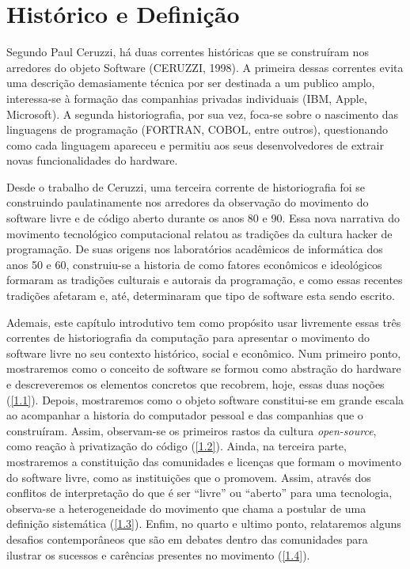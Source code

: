 \chapter{Hist\'orico e Definiç\~ao} \label{1}

Segundo Paul Ceruzzi, há duas correntes históricas que se construíram nos arredores do objeto Software (CERUZZI, 1998). A primeira dessas correntes evita uma descrição demasiamente técnica por ser destinada a um publico amplo, interessa-se à formação das companhias privadas individuais (IBM, Apple, Microsoft). A segunda historiografia, por sua vez, foca-se sobre o nascimento das linguagens de programação (FORTRAN, COBOL, entre outros), questionando como cada linguagem apareceu e permitiu aos seus desenvolvedores de extrair novas funcionalidades do hardware.

Desde o trabalho de Ceruzzi, uma terceira corrente de historiografia foi se construindo paulatinamente nos arredores da observação do movimento do software livre e de código aberto durante os anos 80 e 90. Essa nova narrativa do movimento tecnológico computacional relatou as tradições da cultura hacker de programação. De suas origens nos laboratórios acadêmicos de informática dos anos 50 e 60, construiu-se a historia de como fatores econômicos e ideológicos formaram as tradições culturais e autorais da programação, e como essas recentes tradições afetaram e, até, determinaram que tipo de software esta sendo escrito.

Ademais, este capítulo introdutivo tem como propósito usar livremente essas três correntes de historiografia da computação para apresentar o movimento do software livre no seu contexto histórico, social e econômico. Num primeiro ponto, mostraremos como o conceito de software se formou como abstração do hardware e descreveremos os elementos concretos que recobrem, hoje, essas duas noções (\ref{1.1}). Depois, mostraremos como o objeto software constitui-se em grande escala ao acompanhar a historia do computador pessoal e das companhias que o construíram. Assim, observam-se os primeiros rastos da cultura \emph{open-source}, como reação à privatização do código (\ref{1.2}).  Ainda, na terceira parte, mostraremos a constituição das comunidades e licenças que formam o movimento do software livre, como as instituições que o promovem. Assim, através dos conflitos de interpretação do que é ser “livre” ou “aberto” para uma tecnologia, observa-se a heterogeneidade do movimento que chama a postular de uma definição sistemática (\ref{1.3}). Enfim, no quarto e ultimo ponto, relataremos alguns desafios contemporâneos que são em debates dentro das comunidades para ilustrar os sucessos e carências presentes no movimento (\ref{1.4}).

